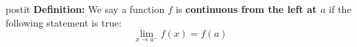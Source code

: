 \documentclass[serif,ignorenonframetext]{beamer}
\begin{document}
\begin{frame}
\begin{columns}
{\begin{beamercolorbox}{postit}
      \textbf{Definition:} We say a function $f$ is
      \textbf{continuous from the left 
        at $a$} if the following statement is true:
      \begin{displaymath}
        \lim_{x\to a^-} f(x) = f(a)
      \end{displaymath}
    \end{beamercolorbox}
				  }%

\end{columns}
\end{frame}
\end{document}
